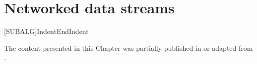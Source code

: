 
\chapter{Networked data streams}


\label{chp:networked_data_streams}


[SUBALG]{Indent}{EndIndent}{}{\algorithmicend\ }%

\begin{tcolorbox}
	\small{
		The content presented in this Chapter was partially published in or adapted from \cite{SpaMHMM, SOHMMM}.
	}
\end{tcolorbox}

